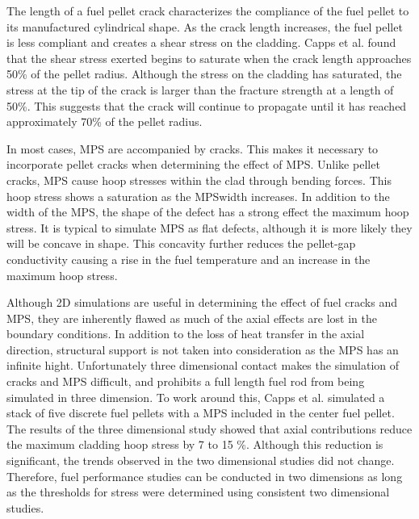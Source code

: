 \documentclass[edeposit,fullpage,11pt]{uiucthesis2009}
\begin{document}
The length of a fuel pellet crack characterizes the compliance of the fuel pellet to its manufactured cylindrical shape.
As the crack length increases, the fuel pellet is less compliant and creates a shear stress on the cladding.
Capps et al. found that the shear stress exerted begins to saturate when the crack length approaches 50\% of the pellet radius.
Although the stress on the cladding has saturated, the stress at the tip of the crack is larger than the fracture strength at a length of 50\%. %
This suggests that the crack will continue to propagate until it has reached approximately 70\% of the pellet radius.

In most cases, \gls{MPS} are accompanied by cracks.
This makes it necessary to incorporate pellet cracks when determining the effect of \gls{MPS}.
Unlike pellet cracks, \gls{MPS} cause hoop stresses within the clad through bending forces.
This hoop stress shows a saturation as the \gls{MPS}width increases.
In addition to the width of the \gls{MPS}, the shape of the defect has a strong effect the maximum hoop stress.
It is typical to simulate \gls{MPS} as flat defects, although it is more likely they will be concave in shape. 
This concavity further reduces the pellet-gap conductivity causing a rise in the fuel temperature and an increase in the maximum hoop stress.

Although 2D simulations are useful in determining the effect of fuel cracks and \gls{MPS}, they are inherently flawed as much of the axial effects are lost in the boundary conditions.
In addition to the loss of heat transfer in the axial direction, structural support is not taken into consideration as the \gls{MPS} has an infinite hight.
Unfortunately three dimensional contact makes the simulation of cracks and \gls{MPS} difficult, and prohibits a full length fuel rod from being simulated in three dimension. 
To work around this, Capps et al. simulated a stack of five discrete fuel pellets with a \gls{MPS} included in the center fuel pellet.
The results of the three dimensional study showed that axial contributions reduce the maximum cladding hoop stress by 7 to 15 \%.
Although this reduction is significant, the trends observed in the two dimensional studies did not change.
Therefore, fuel performance studies can be conducted in two dimensions as long as the thresholds for stress were determined using consistent two dimensional studies.
\end{document}
